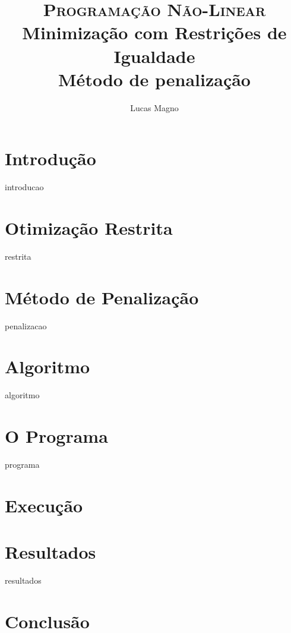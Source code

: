 \documentclass[paper=a4, fontsize=11pt]{scrartcl}	%
\title{
		\usefont{OT1}{bch}{b}{n}
		\normalfont \normalsize \textsc{Programação Não-Linear} \\ [25pt]
		\huge Minimização com Restrições de Igualdade \\
		\LARGE Método de penalização
}
\author{
		\normalfont 								\normalsize
        Lucas Magno\\[-3pt]		\normalsize
}
\date{}
\numberwithin{equation}{section}		%
\numberwithin{figure}{section}			%
\numberwithin{table}{section}			%
\numberwithin{definition}{section}
\numberwithin{theorem}{section}
\numberwithin{algorithm}{section}
\begin{document}
\maketitle

\section{Introdução}
	{introducao}

\section{Otimização Restrita}
	{restrita}

\section{Método de Penalização}
	{penalizacao}

\section{Algoritmo}
	{algoritmo}

\section{O Programa}
	{programa}

\section{Execução}
\section{Resultados}
	{resultados}

\section{Conclusão}


\end{document}
